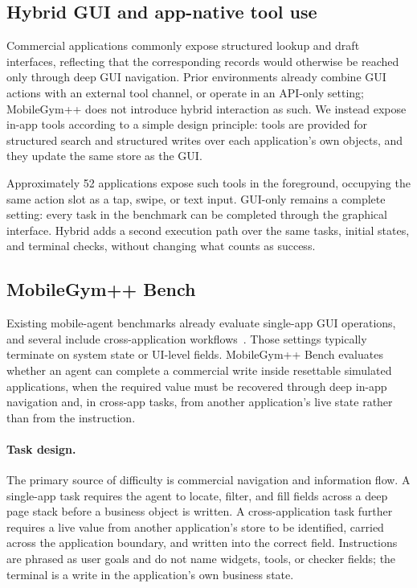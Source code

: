 \subsection{Hybrid GUI and app-native tool use}
\label{sec:mgpp-tools}

Commercial applications commonly expose structured lookup and draft interfaces, reflecting that the corresponding records would otherwise be reached only through deep GUI navigation. Prior environments already combine GUI actions with an external tool channel, or operate in an API-only setting; MobileGym++ does not introduce hybrid interaction as such. We instead expose in-app tools according to a simple design principle: tools are provided for structured search and structured writes over each application's own objects, and they update the same store as the GUI.

Approximately 52 applications expose such tools in the foreground, occupying the same action slot as a tap, swipe, or text input. GUI-only remains a complete setting: every task in the benchmark can be completed through the graphical interface. Hybrid adds a second execution path over the same tasks, initial states, and terminal checks, without changing what counts as success.

\subsection{MobileGym++ Bench}
\label{sec:mgpp-bench}

Existing mobile-agent benchmarks already evaluate single-app GUI operations, and several include cross-application workflows~\citep{rawles2025androidworld,kong2025mobileworld}. Those settings typically terminate on system state or UI-level fields. MobileGym++ Bench evaluates whether an agent can complete a commercial write inside resettable simulated applications, when the required value must be recovered through deep in-app navigation and, in cross-app tasks, from another application's live state rather than from the instruction.

\paragraph{Task design.}
The primary source of difficulty is commercial navigation and information flow. A single-app task requires the agent to locate, filter, and fill fields across a deep page stack before a business object is written. A cross-application task further requires a live value from another application's store to be identified, carried across the application boundary, and written into the correct field. Instructions are phrased as user goals and do not name widgets, tools, or checker fields; the terminal is a write in the application's own business state.

